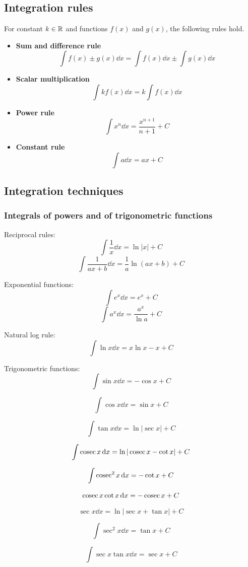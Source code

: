 \subsection{Integration rules}
For constant $k\in\mathbb R$ and functions $f(x)$ and $g(x)$, the following rules hold.
\begin{itemize}
\item \textbf{Sum and difference rule}
\[ \int f(x)\pm g(x) \dd{x} = \int f(x) \dd{x} \pm \int g(x) \dd{x} \]

\item \textbf{Scalar multiplication}
\[ \int kf(x) \dd{x} = k\int f(x) \dd{x} \]

\item \textbf{Power rule}
\[ \int x^n \dd{x} = \frac{x^{n+1}}{n+1} + C \]

\item \textbf{Constant rule}
\[ \int a\dd{x} = ax + C \]
\end{itemize}

\subsection{Integration techniques}
\subsubsection{Integrals of powers and of trigonometric functions}
Reciprocal rules:
\[ \int \frac{1}{x} \dd{x} = \ln|x| + C \]
\[ \int \frac{1}{ax+b} \dd{x} = \frac{1}{a} \ln(ax+b) + C \]

Exponential functions:
\[ \int e^x \dd{x} = e^x + C \]
\[ \int a^{x} \dd{x} = \frac{a^x}{\ln a} + C \]

Natural log rule:
\[ \int \ln x \dd{x} = x\ln x - x + C \]

Trigonometric functions:
\[ \int \sin x \dd{x} = -\cos x + C \]

\[ \int \cos x \dd{x} = \sin x + C \]

\[ \int \tan x \dd{x} = \ln|\sec x| + C \]

\[ \int \operatorname{cosec} x \dd{x} = \ln|\operatorname{cosec} x - \cot x| + C \]

\[ \int \operatorname{cosec}^2x \dd{x} = -\cot x + C \]

\[ \operatorname{cosec} x \cot x \dd{x} = -\operatorname{cosec} x + C \]

\[ \sec x \dd{x} = \ln|\sec x + \tan x| + C \]

\[ \int \sec^2 x \dd{x} = \tan x + C \]

\[ \int \sec x \tan x \dd{x} = \sec x + C \]

